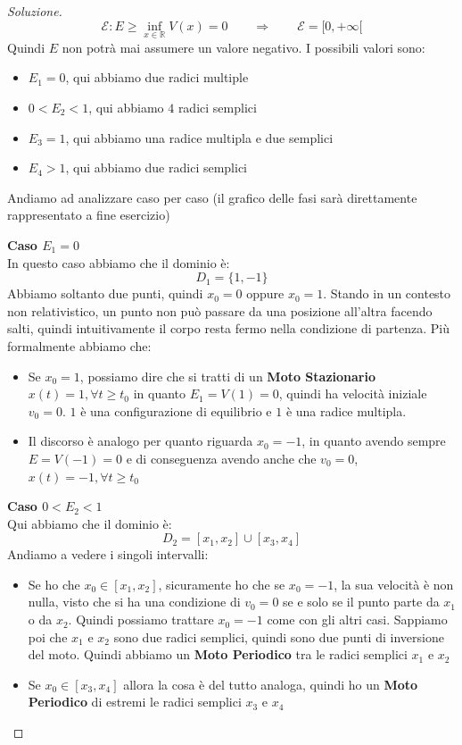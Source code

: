 \documentclass[11pt,a4paper,twoside]{article}
\theoremstyle{definition}
\newenvironment{sol}
	{\renewcommand\qedsymbol{$\blacksquare$}\begin{proof}[Soluzione]}
	{\end{proof}}
\begin{document}
\begin{sol}
	\[ \mathscr E : E \geq \inf_{x \in \mathbb R} V(x) = 0\qquad \Rightarrow \qquad \mathscr E = [0, +\infty[ \]
	Quindi $E$ non potrà mai assumere un valore negativo. I possibili valori sono:
	\begin{itemize}
		\item $E_1 = 0$, qui abbiamo due radici multiple
		\item $0<E_2<1$, qui abbiamo $4$ radici semplici
		\item $E_3 = 1$, qui abbiamo una radice multipla e due semplici
		\item $E_4>1$, qui abbiamo due radici semplici
	\end{itemize}
	Andiamo ad analizzare caso per caso (il grafico delle fasi sarà direttamente rappresentato a fine esercizio)

	\textbf{Caso $E_1 = 0$}\\
	In questo caso abbiamo che il dominio è:
	\[ D_1 = \{1,-1\} \]
	Abbiamo soltanto due punti, quindi $x_0 = 0$ oppure $x_0 = 1$. Stando in un contesto non relativistico, un punto non può passare da una posizione all'altra facendo salti, quindi intuitivamente il corpo resta fermo nella condizione di partenza. Più formalmente abbiamo che:
	\begin{itemize}
		\item Se $x_0 = 1$, possiamo dire che si tratti di un \textbf{Moto Stazionario} $x(t) = 1, \forall t \geq t_0$ in quanto $E_1 = V(1) = 0$, quindi ha velocità iniziale $v_0 = 0$. $1$ è una configurazione di equilibrio e $1$ è una radice multipla.
		\item Il discorso è analogo per quanto riguarda $x_0 = -1$, in quanto avendo sempre $E = V(-1) = 0$ e di conseguenza avendo anche che $v_0 = 0$, $x(t) = -1, \forall t \geq t_0$
	\end{itemize}

	\textbf{Caso $0<E_2<1$}\\
	Qui abbiamo che il dominio è:
	\[ D_2 = [x_1,x_2] \cup [x_3,x_4] \]
	Andiamo a vedere i singoli intervalli:
	\begin{itemize}
		\item Se ho che $x_0 \in [x_1,x_2]$, sicuramente ho che se $x_0 = -1$, la sua velocità è non nulla, visto che si ha una condizione di $v_0  = 0$ se e solo se il punto parte da $x_1$ o da $x_2$. Quindi possiamo trattare $x_0 = -1$ come con gli altri casi. Sappiamo poi che $x_1$ e $x_2$ sono due radici semplici, quindi sono due punti di inversione del moto. Quindi abbiamo un \textbf{Moto Periodico} tra le radici semplici $x_1$ e $x_2$
		\item Se $x_0 \in [x_3,x_4]$ allora la cosa è del tutto analoga, quindi ho un \textbf{Moto Periodico} di estremi le radici semplici $x_3$ e $x_4$
	\end{itemize}


\end{sol}
\end{document}
